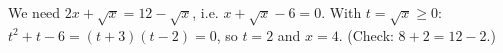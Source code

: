 We need $2x+\sqrt x=12-\sqrt x$, i.e. $x+\sqrt x-6=0$. With $t=\sqrt x\ge0$: $t^2+t-6=(t+3)(t-2)=0$, so $t=2$ and $x=\boxed{4}$. (Check: $8+2=12-2$.)
